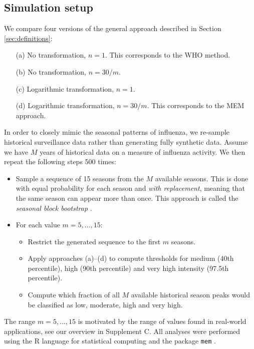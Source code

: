 \documentclass{article}
\begin{document}
\subsection{Simulation setup}
\label{subsec:simulation_setup}

We compare four versions of the general approach described in Section \ref{sec:definitions}:
\begin{enumerate}
\item[(a)] No transformation, $n = 1$. This corresponds to the WHO method.
\item[(b)] No transformation, $n = 30/m$.
\item[(c)] Logarithmic transformation, $n = 1$.
\item[(d)] Logarithmic transformation, $n = 30/m$. This corresponds to the MEM approach.
\end{enumerate}
In order to closely mimic the seasonal patterns of influenza, we re-sample historical surveillance data rather than generating fully synthetic data. Assume we have $M$ years of historical data on a measure of influenza activity. We then repeat the following steps 500 times:

\begin{itemize}
\item Sample a sequence of 15 seasons from the $M$ available seasons. This is done with equal probability for each season and \textit{with replacement}, meaning that the same season can appear more than once. This approach is called the \textit{seasonal block bootstrap} \citep{Politis2001}.
\item For each value $m = 5, \dots, 15$:
\begin{itemize}
\item Restrict the generated sequence to the first $m$ seasons.
\item Apply approaches (a)--(d) to compute thresholds for medium (40th percentile), high (90th percentile) and very high intensity (97.5th percentile).
\item Compute which fraction of all $M$ available historical season peaks would be classified as low, moderate, high and very high.
\end{itemize}
\end{itemize}
The range $m =5, \dots, 15$ is motivated by the range of values found in real-world applications, see our overview in Supplement C. All analyses were performed using the R language for statistical computing \citep{RCT2020} and the package \texttt{mem} \citep{Lozano2020}.
\end{document}
